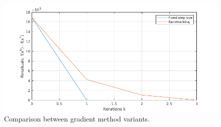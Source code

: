 \documentclass[]{article}
\begin{document}
\begin{figure}[H]
	\includegraphics[scale=0.6]{1_3.png}
	\caption{Comparison between gradient method variants.}
\end{figure}
\end{document}
